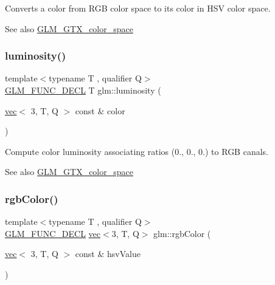 Converts a color from R\+GB color space to its color in H\+SV color space. \begin{DoxySeeAlso}{See also}
\hyperlink{group__gtx__color__space}{G\+L\+M\+\_\+\+G\+T\+X\+\_\+color\+\_\+space} 
\end{DoxySeeAlso}
\mbox{\label{group__gtx__color__space_gad028e0a4f1a9c812b39439b746295b34}} 
\subsubsection{\texorpdfstring{luminosity()}{luminosity()}}
{\footnotesize\ttfamily template$<$typename T , qualifier Q$>$ \\
\hyperlink{setup_8hpp_ab2d052de21a70539923e9bcbf6e83a51}{G\+L\+M\+\_\+\+F\+U\+N\+C\+\_\+\+D\+E\+CL} T glm\+::luminosity (\begin{DoxyParamCaption}\item[{\hyperlink{structglm_1_1vec}{vec}$<$ 3, T, Q $>$ const \&}]{color }\end{DoxyParamCaption})}

Compute color luminosity associating ratios (0., 0., 0.) to R\+GB canals. \begin{DoxySeeAlso}{See also}
\hyperlink{group__gtx__color__space}{G\+L\+M\+\_\+\+G\+T\+X\+\_\+color\+\_\+space} 
\end{DoxySeeAlso}
\mbox{\label{group__gtx__color__space_ga5f9193be46f45f0655c05a0cdca006db}} 
\subsubsection{\texorpdfstring{rgb\+Color()}{rgbColor()}}
{\footnotesize\ttfamily template$<$typename T , qualifier Q$>$ \\
\hyperlink{setup_8hpp_ab2d052de21a70539923e9bcbf6e83a51}{G\+L\+M\+\_\+\+F\+U\+N\+C\+\_\+\+D\+E\+CL} \hyperlink{structglm_1_1vec}{vec}$<$3, T, Q$>$ glm\+::rgb\+Color (\begin{DoxyParamCaption}\item[{\hyperlink{structglm_1_1vec}{vec}$<$ 3, T, Q $>$ const \&}]{hsv\+Value }\end{DoxyParamCaption})}

